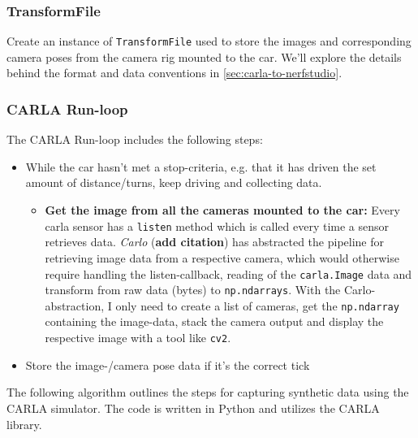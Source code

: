 \subsubsection{TransformFile}

Create an instance of \texttt{TransformFile} used to store the images and corresponding camera poses from the camera rig mounted to the car. We’ll explore the details behind the format and data conventions in \autoref{sec:carla-to-nerfstudio}.

\subsubsection{CARLA Run-loop}
The CARLA Run-loop includes the following steps:

\begin{itemize}
    \item While the car hasn’t met a stop-criteria, e.g. that it has driven the set amount of distance/turns, keep driving and collecting data.
    \begin{itemize}
        \item \textbf{Get the image from all the cameras mounted to the car:} Every carla sensor has a \texttt{listen} method which is called every time a sensor retrieves data. \textit{Carlo} (\textbf{add citation}) has abstracted the pipeline for retrieving image data from a respective camera, which would otherwise require handling the listen-callback, reading of the \texttt{carla.Image} data and transform from raw data (bytes) to \texttt{np.ndarrays}. With the Carlo-abstraction, I only need to create a list of cameras, get the \texttt{np.ndarray} containing the image-data, stack the camera output and display the respective image with a tool like \texttt{cv2}.
    \end{itemize}
    \item Store the image-/camera pose data if it’s the correct tick
\end{itemize}


The following algorithm outlines the steps for capturing synthetic data using the CARLA simulator. The code is written in Python and utilizes the CARLA library.

